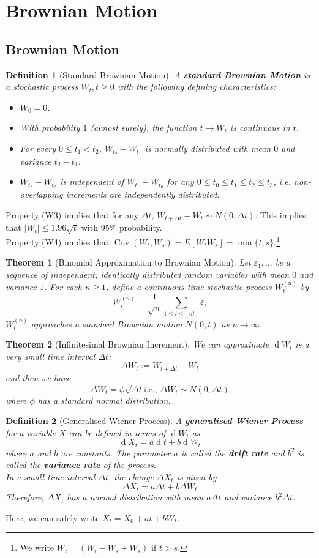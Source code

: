 \documentclass[12pt]{article}
\newtheorem{definition}{Definition}[section]
\newtheorem{theorem}{Theorem}[section]
\theoremstyle{definition}
\DeclareMathOperator{\diff}{d}
\DeclareMathOperator{\cov}{Cov}
\begin{document}
\section{Brownian Motion}
\subsection{Brownian Motion}
\begin{definition}[Standard Brownian Motion]
\normalfont A \textbf{standard Brownian Motion} is a stochastic process $W_t, t\geq 0$ with the following defining characteristics:
\begin{itemize}
  \item[(W1)] $W_0=0$.
  \item[(W2)] With probability $1$ (almost surely), the function $t\to W_t$ is continuous in $t$.
  \item[(W3)] For every $0\leq t_1<t_2$, $W_{t_2}-W_{t_1}$ is normally distributed with mean $0$ and variance $t_2-t_1$.
  \item[(W4)] $W_{t_3}-W_{t_2}$ is independent of $W_{t_1}-W_{t_0}$ for any $0\leq t_0\leq t_1\leq t_2\leq t_3$, i.e. non-overlapping increments are independently distributed.
\end{itemize}
\end{definition}
Property (W3) implies that for any $\Delta t$, $W_{t+\Delta t}-W_t\sim N(0,\Delta t)$. This implies that $|W_t|\leq 1.96\sqrt{t}$ with 95\% probability.\\
Property (W4) implies that $\cov (W_t, W_s) = E[W_tW_s] = \min\{t,s\}$.\footnote{We write $W_t=(W_t-W_s+W_s)$ if $t>s$.}
\begin{theorem}[Binomial Approximation to Brownian Motion]
\normalfont Let $\varepsilon_1,\ldots$ be a sequence of independent, identically distributed random variables with mean $0$ and variance $1$. For each $n\geq 1$, define a continuous time stochastic process $W_t^{(n)}$ by
\[
W_t^{(n)} = \frac{1}{\sqrt{n}} \sum_{1\leq i\leq [nt]} \varepsilon_i
\]
$W_t^{(n)}$ approaches a standard Brownian motion $N(0,t)$ as $n\to \infty$.
\end{theorem}
\begin{theorem}[Infinitesimal Brownian Increment]
\normalfont We can approximate $\diff W_t$ is a very small time interval $\Delta t$:
\[
\Delta W_t:=W_{t+\Delta t} - W_t
\]
and then we have
\[
\Delta W_t = \phi \sqrt{\Delta t} \text{i.e., }\Delta W_t \sim N(0, \Delta t)
\]
where $\phi$ has a standard normal distribution.
\end{theorem}
\begin{definition}[Generalised Wiener Process]
\normalfont A \textbf{generalised Wiener Process} for a variable $X$ can be defined in terms of $\diff W_t$ as
\[
\diff X_t = a\diff t + b\diff W_t
\]
where $a$ and $b$ are constants. The parameter $a$ is called the \textbf{drift rate} and $b^2$ is called the \textbf{variance rate} of the process.\\
In a small time interval $\Delta t$, the change $\Delta X_t$ is given by
\[
\Delta X_t = a\Delta t + b\Delta W_t
\]
Therefore, $\Delta X_t$ has a normal distribution with mean $a\Delta t$ and variance $b^2\Delta t$.
\end{definition}
Here, we can safely write $X_t = X_0+at+bW_t$.
\end{document}
